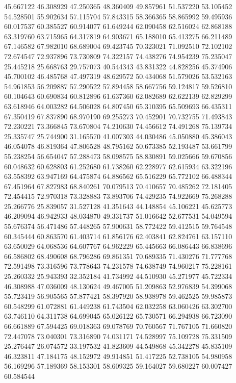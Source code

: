 45.667122
46.308929
47.250365
48.360409
49.857961
51.537220
53.105452
54.528501
55.902634
57.115704
57.843315
58.366365
58.865992
59.495936
60.017537
60.385527
60.914077
61.649244
62.090458
62.516024
62.868188
63.319760
63.715965
64.317819
64.903671
65.188010
65.413275
66.211489
67.146582
67.982010
68.689004
69.423745
70.323021
71.092510
72.102102
72.674547
72.937896
73.730809
74.322157
74.438276
74.954239
75.235047
25.445218
25.668763
29.757073
40.544343
43.831322
44.828256
45.374906
45.700102
46.485768
47.497319
48.629572
50.434068
51.579026
53.532163
54.961853
56.209887
57.290522
57.894458
58.667756
59.124817
59.526810
60.104643
60.690834
60.812896
61.637360
62.082689
62.622139
62.829299
63.618946
64.003282
64.506028
64.807450
65.310395
65.509693
66.435311
67.350419
67.837890
68.970190
69.255273
70.452901
70.732755
71.493843
72.230221
73.366845
73.670804
74.210630
74.456612
74.491268
75.139734
25.335747
25.744900
31.165570
41.007303
44.030486
45.050880
45.386043
46.054078
46.819364
47.806528
48.795162
50.673385
52.193487
53.661799
55.238254
56.654047
57.288473
58.098575
58.830891
59.025666
59.670856
60.048632
60.628803
61.252680
61.738260
62.228977
62.615934
63.322196
63.558392
63.947169
64.475874
64.886562
65.516229
65.772102
66.488344
67.451964
67.827983
68.840261
70.079513
70.410657
70.485262
72.181405
72.454415
72.970318
73.328883
73.893706
74.429235
74.922669
75.268288
25.266776
25.839057
31.527128
41.351643
44.148854
45.106221
45.625773
46.209094
46.942933
48.034870
49.331737
51.016642
52.677531
54.049594
55.676374
56.471486
57.448265
57.900631
58.772422
59.412515
59.764548
60.345444
60.863570
61.403714
61.856176
62.403841
62.824761
63.157110
63.650029
64.068536
64.607767
64.962229
65.445663
66.086443
66.838696
66.586802
68.490608
68.796286
69.861351
70.689335
71.430276
71.777768
72.591498
73.316596
73.778643
74.231578
74.638749
74.960217
75.228161
25.260332
25.943393
32.352184
41.734992
44.510930
45.271977
45.722334
46.308988
47.036009
48.130624
49.467005
51.209863
52.976839
54.399068
55.723419
56.905565
57.877421
58.397920
58.938978
59.462525
59.985873
60.548299
61.072881
61.449238
61.743504
62.032258
63.060426
63.302700
63.746110
64.311738
64.699045
65.026122
65.730571
66.294938
66.723090
66.661889
67.594425
69.018363
69.078769
70.760567
71.767105
71.660820
72.447078
73.040301
73.316890
74.031171
74.528997
75.109728
75.331509
25.276447
26.074572
33.197532
41.823609
44.549868
45.342278
45.835109
46.323811
47.184175
48.152972
49.914851
51.417225
52.738105
54.980958
56.169296
57.189369
58.153301
58.609325
59.164027
59.680227
60.007427
60.584544
